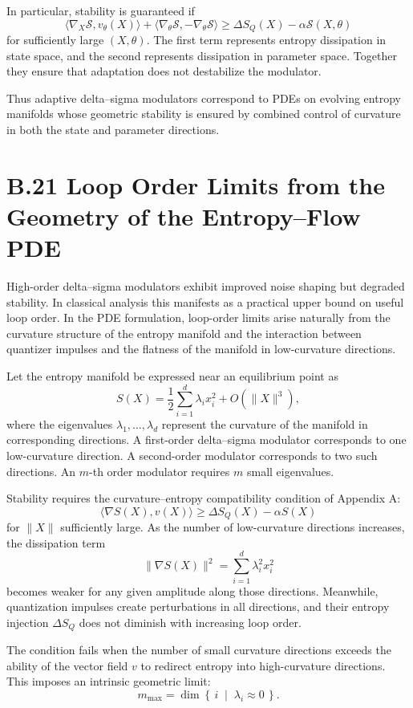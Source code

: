 In particular, stability is guaranteed if
\[
\langle\nabla_{X}\mathcal{S}, v_{\theta}(X) \rangle
+ \langle\nabla_{\theta}\mathcal{S}, -\nabla_{\theta}\mathcal{S} \rangle
\ge
\Delta S_{Q}(X) - \alpha \mathcal{S}(X,\theta)
\]
for sufficiently large \((X,\theta)\). The first term represents entropy dissipation in state space, and the second represents dissipation in parameter space. Together they ensure that adaptation does not destabilize the modulator.

Thus adaptive delta–sigma modulators correspond to PDEs on evolving entropy manifolds whose geometric stability is ensured by combined control of curvature in both the state and parameter directions.

\section{B.21 Loop Order Limits from the Geometry of the Entropy–Flow PDE}

High-order delta–sigma modulators exhibit improved noise shaping but degraded stability. In classical analysis this manifests as a practical upper bound on useful loop order. In the PDE formulation, loop-order limits arise naturally from the curvature structure of the entropy manifold and the interaction between quantizer impulses and the flatness of the manifold in low-curvature directions.

Let the entropy manifold be expressed near an equilibrium point as
\[
S(X) = \frac{1}{2}\sum_{i=1}^{d} \lambda_{i} x_{i}^{2} + O(\|X\|^{3}),
\]
where the eigenvalues \(\lambda_{1},\ldots,\lambda_{d}\) represent the curvature of the manifold in corresponding directions. A first-order delta–sigma modulator corresponds to one low-curvature direction. A second-order modulator corresponds to two such directions. An \(m\)-th order modulator requires \(m\) small eigenvalues.

Stability requires the curvature–entropy compatibility condition of Appendix A:
\[
\langle \nabla S(X), v(X) \rangle \ge \Delta S_{Q}(X) - \alpha S(X)
\]
for \(\|X\|\) sufficiently large. As the number of low-curvature directions increases, the dissipation term
\[
\|\nabla S(X)\|^{2}
= \sum_{i=1}^{d} \lambda_{i}^{2} x_{i}^{2}
\]
becomes weaker for any given amplitude along those directions. Meanwhile, quantization impulses create perturbations in all directions, and their entropy injection \(\Delta S_{Q}\) does not diminish with increasing loop order.

The condition fails when the number of small curvature directions exceeds the ability of the vector field \(v\) to redirect entropy into high-curvature directions. This imposes an intrinsic geometric limit:
\[
m_{\max}
= \dim \left\{\, i \;\middle|\; \lambda_{i} \approx 0 \,\right\}.
\]

